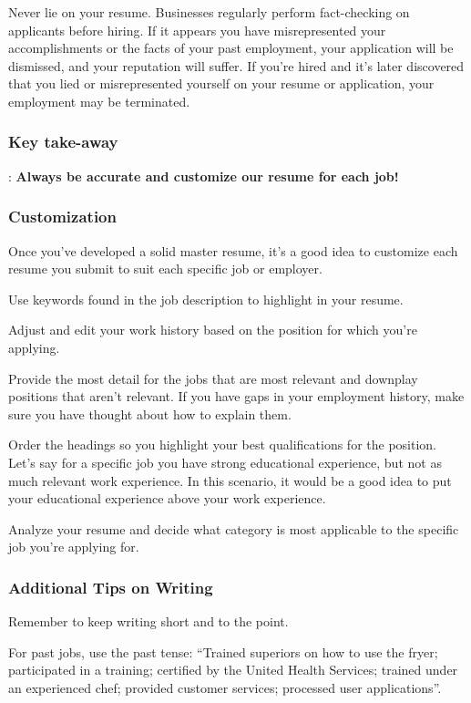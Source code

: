 Never lie on your resume. Businesses regularly perform fact-checking on applicants before hiring. If it appears you have misrepresented your accomplishments or the facts of your past employment, your application will be dismissed, and your reputation will suffer. If you're hired and it's later discovered that you lied or misrepresented yourself on your resume or application, your employment may be terminated.

\subsubsection*{Key take-away}:
\break \textbf{Always be accurate and customize our resume for each job!}

\subsubsection*{Customization}

Once you've developed a solid master resume, it's a good idea to customize each resume you submit to suit each specific job or employer.

Use keywords found in the job description to highlight in your resume.

Adjust and edit your work history based on the position for which you're applying.

Provide the most detail for the jobs that are most relevant and downplay positions that aren't relevant. If you have gaps in your employment history, make sure you have thought about how to explain them.

Order the headings so you highlight your best qualifications for the position. Let's say for a specific job you have strong educational experience, but not as much relevant work experience. In this scenario, it would be a good idea to put your educational experience above your work experience.

Analyze your resume and decide what category is most applicable to the specific job you're applying for.

\subsubsection*{Additional Tips on Writing}

Remember to keep writing short and to the point.

For past jobs, use the past tense: ``Trained superiors on how to use the fryer; participated in a training; certified by the United Health Services; trained under an experienced chef; provided customer services; processed user applications''.

